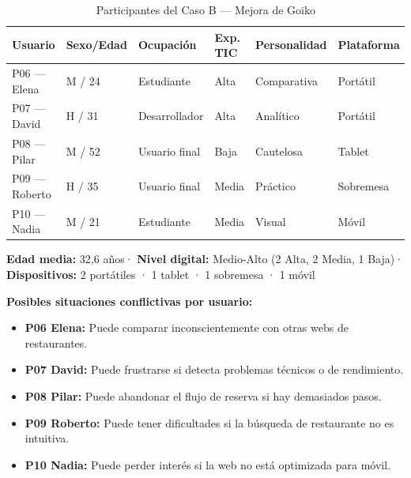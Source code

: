 \documentclass[11pt,a4paper]{article}
\begin{document}
\vspace{0.4em}
\begin{table}[H]
\centering
\caption{Participantes del Caso B — Mejora de Goiko}
\begin{tabularx}{\textwidth}{@{}
    C{1.9cm} C{1.5cm} L{2.8cm} C{1.6cm} C{2.2cm} C{2.2cm}@{}}
\toprule
{}
\color{white}\textbf{Usuario}     &
\color{white}\textbf{Sexo/Edad}   &
\color{white}\textbf{Ocupación}   &
\color{white}\textbf{Exp. TIC}    &
\color{white}\textbf{Personalidad}&
\color{white}\textbf{Plataforma}  \\
\midrule
P06 — Elena   & M / 24 & Estudiante    & Alta  & Comparativa & Portátil  \\
P07 — David   & H / 31 & Desarrollador & Alta  & Analítico   & Portátil  \\
P08 — Pilar   & M / 52 & Usuario final & Baja  & Cautelosa   & Tablet    \\
P09 — Roberto & H / 35 & Usuario final & Media & Práctico    & Sobremesa \\
P10 — Nadia   & M / 21 & Estudiante    & Media & Visual      & Móvil     \\
\bottomrule
\end{tabularx}
\end{table}

\begin{infobox}
\textbf{Edad media:} 32,6 años\enspace·\enspace
\textbf{Nivel digital:} Medio-Alto (2 Alta, 2 Media, 1 Baja)\enspace·\enspace
\textbf{Dispositivos:} 2 portátiles · 1 tablet · 1 sobremesa · 1 móvil
\end{infobox}

\textbf{Posibles situaciones conflictivas por usuario:}

\begin{itemize}
  \item \textbf{P06 Elena:} Puede comparar inconscientemente con otras webs de restaurantes.
  \item \textbf{P07 David:} Puede frustrarse si detecta problemas técnicos o de rendimiento.
  \item \textbf{P08 Pilar:} Puede abandonar el flujo de reserva si hay demasiados pasos.
  \item \textbf{P09 Roberto:} Puede tener dificultades si la búsqueda de restaurante no es intuitiva.
  \item \textbf{P10 Nadia:} Puede perder interés si la web no está optimizada para móvil.
\end{itemize}
\end{document}
